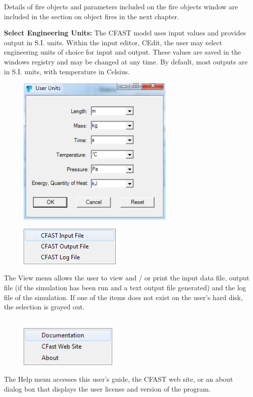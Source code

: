 Details of fire objects and parameters included on the fire objects window are included in the section on object fires in the next chapter.

\textbf{Select Engineering Units:} The CFAST model uses input values and provides output in S.I. units. Within the input editor, CEdit, the user may select engineering units of choice for input and output.  These values are saved in the windows registry and may be changed at any time. By default, most outputs are in S.I. units, with temperature in Celsius.

\begin{figure}[h!]
\begin{center}
  \includegraphics[width=3in]{FIGURES/Running_CFAST/Select_Engineering_Units}
\end{center}
\end{figure}

\clearpage

\begin{figure}
  \includegraphics[width=1.95in]{FIGURES/Running_CFAST/View_Menu}
\end{figure}

The View menu allows the user to view and / or print the input data file, output file (if the simulation has been run and a text output file generated) and the log file of the simulation. If one of the items does not exist on the user's hard disk, the selection is grayed out. \\~ \\

\begin{figure}
  \includegraphics[width=1.88in]{FIGURES/Running_CFAST/Help_Menu}
\end{figure}
 The Help menu accesses this user's guide, the CFAST web site, or an about dialog box that displays the user license and version of the program. \\~ \\

